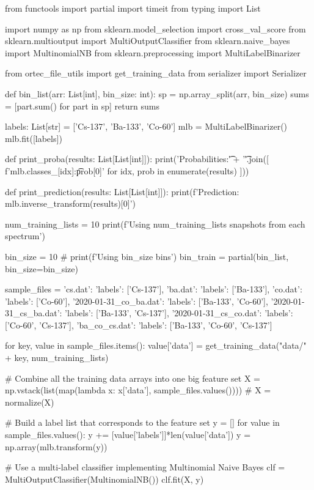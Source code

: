 \documentclass[onecolumn, draftclsnofoot,10pt, compsoc]{IEEEtran}
\begin{document}
\begin{python}
from functools import partial
import timeit
from typing import List

import numpy as np
from sklearn.model_selection import cross_val_score
from sklearn.multioutput import MultiOutputClassifier
from sklearn.naive_bayes import MultinomialNB
from sklearn.preprocessing import MultiLabelBinarizer

from ortec_file_utils import get_training_data
from serializer import Serializer


def bin_list(arr: List[int], bin_size: int):
    sp = np.array_split(arr, bin_size)
    sums = [part.sum() for part in sp]
    return sums


labels: List[str] = ['Cs-137', 'Ba-133', 'Co-60']
mlb = MultiLabelBinarizer()
mlb.fit([labels])


def print_proba(results: List[List[int]]):
    print('Probabilities:\n\t' + '\n\t'.join([
        f'{mlb.classes_[idx]}:\t{prob[0]}' for idx, prob in enumerate(results)
    ]))


def print_prediction(results: List[List[int]]):
    print(f'Prediction: {mlb.inverse_transform(results)[0]}')


num_training_lists = 10
print(f'Using {num_training_lists} snapshots from each spectrum')

bin_size = 10
# print(f'Using {bin_size} bins')
bin_train = partial(bin_list, bin_size=bin_size)

sample_files = {
    'cs.dat': {'labels': ['Cs-137']},
    'ba.dat': {'labels': ['Ba-133']},
    'co.dat': {'labels': ['Co-60']},
    '2020-01-31_co_ba.dat': {'labels': ['Ba-133', 'Co-60']},
    '2020-01-31_cs_ba.dat': {'labels': ['Ba-133', 'Cs-137']},
    '2020-01-31_cs_co.dat': {'labels': ['Co-60', 'Cs-137']},
    'ba_co_cs.dat': {'labels': ['Ba-133', 'Co-60', 'Cs-137']}
}

for key, value in sample_files.items():
    value['data'] = get_training_data("data/" + key, num_training_lists)

# Combine all the training data arrays into one big feature set
X = np.vstack(list(map(lambda x: x['data'], sample_files.values())))
# X = normalize(X)

# Build a label list that corresponds to the feature set
y = []
for value in sample_files.values():
    y += [value['labels']]*len(value['data'])
y = np.array(mlb.transform(y))

# Use a multi-label classifier implementing Multinomial Naive Bayes
clf = MultiOutputClassifier(MultinomialNB())
clf.fit(X, y)


\end{python}
\end{document}

